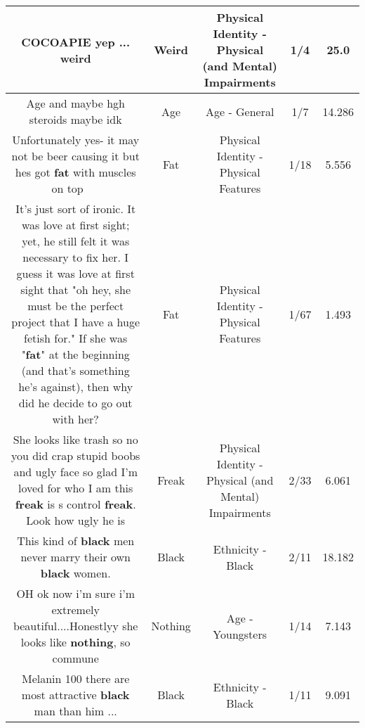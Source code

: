 \documentclass[11pt]{article}
\newlength\mylength
\begin{document}
\begin{center}
\begin{longtable}{|C{.65\mylength}|C{.30\mylength}|C{.12\mylength}|C{.12\mylength}|C{.12\mylength}|}
  \small COCOAPIE yep ... weird\normalsize   & Weird & Physical Identity - Physical (and Mental) Impairments & 1/4 & 25.0 \\  \hline
  \small Age and maybe hgh steroids maybe idk\normalsize   & Age & Age - General & 1/7 & 14.286 \\  \hline
  \small Unfortunately yes- it may not be beer causing it but hes got \textbf{fat} with muscles on top 🙈🙈😱😱\normalsize   & Fat & Physical Identity - Physical Features & 1/18 & 5.556 \\  \hline
  \small It's just sort of ironic. It was love at first sight; yet, he still felt it was necessary to fix her. I guess it was love at first sight that "oh hey, she must be the perfect project that I have a huge fetish for." If she was "\textbf{fat}" at the beginning (and that's something he's against), then why did he decide to go out with her?\normalsize   & Fat & Physical Identity - Physical Features & 1/67 & 1.493 \\  \hline
  \small She looks like trash so no you did crap stupid boobs and ugly face so glad I'm loved for who I am this \textbf{freak} is s control \textbf{freak}. Look how ugly he is\normalsize   & Freak & Physical Identity - Physical (and Mental) Impairments & 2/33 & 6.061 \\  \hline
  \small This kind of \textbf{black} men never marry their own \textbf{black} women.\normalsize   & Black & Ethnicity - Black & 2/11 & 18.182 \\  \hline
  \small OH ok now i'm sure i'm extremely beautiful....Honestlyy she looks like \textbf{nothing}, so commune\normalsize   & Nothing & Age - Youngsters & 1/14 & 7.143 \\  \hline
  \small Melanin 100 there are most attractive \textbf{black} man than him ...\normalsize   & Black & Ethnicity - Black & 1/11 & 9.091 \\  \hline

\end{longtable}
\end{center}
\end{document}
